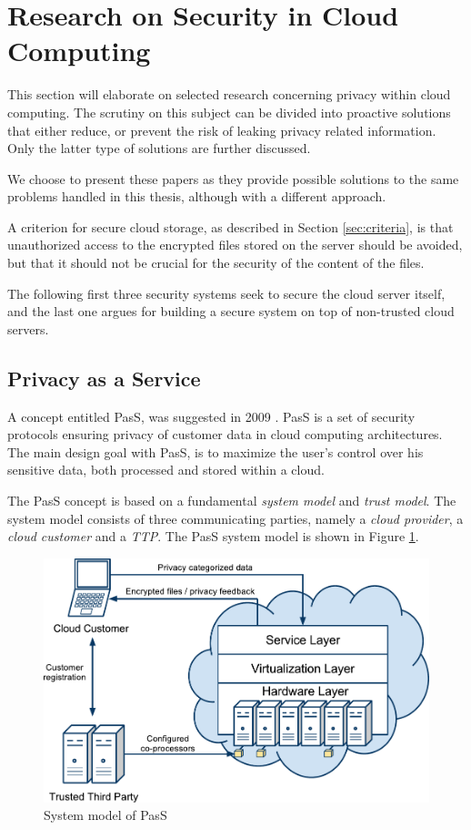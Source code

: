 \documentclass[pdftex,english,10pt,b5paper,twoside]{book}
\begin{document}
\section{Research on Security in Cloud Computing}
\label{sec:research}

This section will elaborate on selected research concerning privacy
within cloud computing. The scrutiny on this subject can be divided into
proactive solutions that either reduce, or prevent the risk of leaking privacy
related information. Only the latter type of solutions are further discussed.

We choose to present these papers as they provide possible solutions to the
same problems handled in this thesis, although with a different approach.  

A
criterion for secure cloud storage, as described in Section \ref{sec:criteria},
is that unauthorized access to the encrypted files stored on the server should
be avoided, but that it should not be crucial for the security of the content
of the files. 


The following first three security systems seek to secure the cloud server
itself, and the last one argues for building a secure system on top of
non-trusted cloud servers.

\subsection{Privacy as a Service}

A concept entitled \ac{PasS}, was suggested in 2009 \cite{PasS}. \ac{PasS} is a
set of security protocols ensuring privacy of customer data in cloud computing
architectures. The main design goal with \ac{PasS}, is to maximize the user's
control over his sensitive data, both processed and stored within a cloud.

The \ac{PasS} concept is based on a fundamental \emph{system model} and
\emph{trust model}. The system model consists of three communicating parties,
namely a \emph{cloud provider}, a \emph{cloud customer} and a \emph{\ac{TTP}}.
The \ac{PasS} system model is shown in Figure \ref{fig:RW:PasS}.

\begin{figure}[h!]
    \centering
    \includegraphics[scale=0.6]{ArchitecturePasS.pdf}
    \caption{System model of PasS}
    \label{fig:RW:PasS}
\end{figure}
\end{document}
